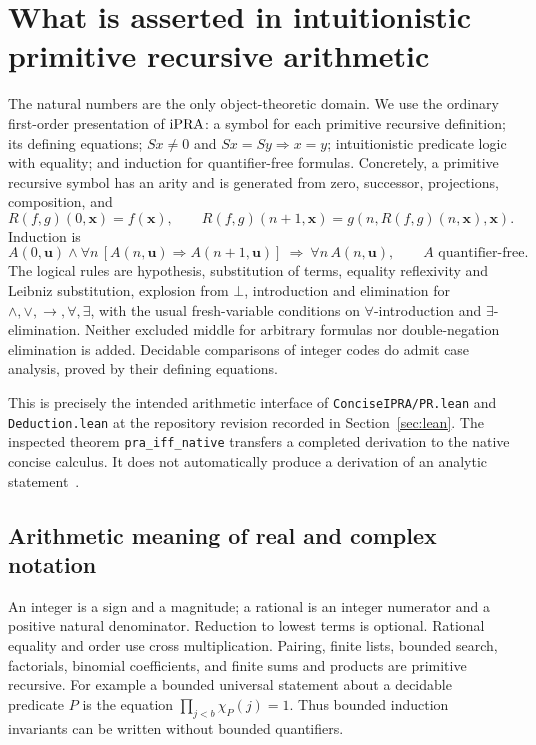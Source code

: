 \section{What is asserted in intuitionistic primitive recursive arithmetic}
\label{sec:foundations}

The natural numbers are the only object-theoretic domain. We use the
ordinary first-order presentation of $\mathrm{iPRA}$: a symbol for each primitive
recursive definition; its defining equations; $Sx\ne0$ and
$Sx=Sy\Rightarrow x=y$; intuitionistic predicate logic with equality; and
induction for quantifier-free formulas. Concretely, a primitive recursive
symbol has an arity and is generated from zero, successor, projections,
composition, and
\[
 R(f,g)(0,\mathbf x)=f(\mathbf x),\qquad
 R(f,g)(n+1,\mathbf x)=g(n,R(f,g)(n,\mathbf x),\mathbf x).
\]
Induction is
\[
 A(0,\mathbf u)\wedge
 \forall n\,[A(n,\mathbf u)\Rightarrow A(n+1,\mathbf u)]
 \ \Rightarrow\ \forall n\,A(n,\mathbf u),
 \qquad A\text{ quantifier-free}.
\]
The logical rules are hypothesis, substitution of terms, equality
reflexivity and Leibniz substitution, explosion from $\bot$, introduction
and elimination for $\wedge,\vee,\to,\forall,\exists$, with the usual
fresh-variable conditions on $\forall$-introduction and
$\exists$-elimination. Neither excluded middle for arbitrary formulas nor
double-negation elimination is added. Decidable comparisons of integer
codes do admit case analysis, proved by their defining equations.

This is precisely the intended arithmetic interface of
\texttt{ConciseIPRA/PR.lean} and \texttt{Deduction.lean} at the repository
revision recorded in Section~\ref{sec:lean}. The inspected theorem
\texttt{pra\_iff\_native} transfers a completed derivation to the native
concise calculus. It does not automatically produce a derivation of an
analytic statement~\cite{ProveIt}.

\subsection{Arithmetic meaning of real and complex notation}
An integer is a sign and a magnitude; a rational is an integer numerator
and a positive natural denominator. Reduction to lowest terms is optional.
Rational equality and order use cross multiplication. Pairing, finite
lists, bounded search, factorials, binomial coefficients, and finite sums
and products are primitive recursive. For example a bounded universal
statement about a decidable predicate $P$ is the equation
$\prod_{j<b}\chi_P(j)=1$. Thus bounded induction invariants can be
written without bounded quantifiers.

